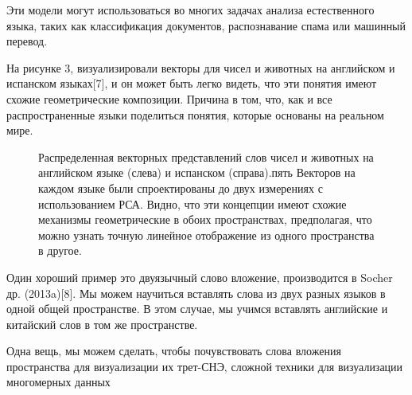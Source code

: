 \documentclass[12pt]{article}
\begin{document}
Эти модели могут использоваться во многих задачах анализа естественного языка, таких как классификация документов, распознавание спама или машинный перевод.

На рисунке 3, визуализировали векторы для чисел и животных на английском и испанском языках[7], и он может быть легко видеть, что эти понятия имеют схожие геометрические композиции. Причина в том, что, как и все распространенные языки поделиться понятия, которые основаны на реальном мире.
	\begin{figure}[H]
		\noindent{}
		\caption{Распределенная векторных представлений слов чисел и животных на английском языке (слева) и испанском (справа).пять Векторов на каждом языке были спроектированы до двух измерениях с использованием РСА. Видно, что эти концепции имеют схожие механизмы геометрические в обоих пространствах, предполагая, что можно узнать точную линейное отображение из одного пространства в другое.}
		\label{figCurves}
	\end{figure}

Один хороший пример это двуязычный слово вложение, производится в Socher др. (2013a)[8]. Мы можем научиться вставлять слова из двух разных языков в одной общей пространстве. В этом случае, мы учимся вставлять английские и китайский слов в том же пространстве.

Одна вещь, мы можем сделать, чтобы почувствовать слова вложения пространства для визуализации их трет-СНЭ, сложной техники для визуализации многомерных данных
\end{document}
